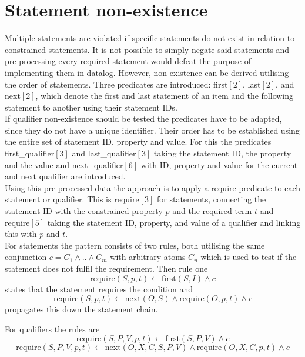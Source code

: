 \documentclass[hyperref,bachelorofscience,fleqn]{cgvpub}
\begin{document}
\section{Statement non-existence}\label{sec_statement_non-existence}
Multiple statements are violated if specific statements do not exist in relation to constrained statements. It is not possible to simply negate said statements and pre-processing every required statement would defeat the purpose of implementing them in datalog. However, non-existence can be derived utilising the order of statements. Three predicates are introduced: first\([2]\), last\([2]\), and next\([2]\), which denote the first and last statement of an item and the following statement to another using their statement IDs.\\

If qualifier non-existence should be tested the predicates have to be adapted, since they do not have a unique identifier. Their order has to be established using the entire set of statement ID, property and value. For this the predicates first\_qualifier\([3]\) and last\_qualifier\([3]\) taking the statement ID, the property and the value and next\_qualifier\([6]\) with ID, property and value for the current and next qualifier are introduced.\\

Using this pre-processed data the approach is to apply a require-predicate to each statement or qualifier. This is require\([3]\) for statements, connecting the statement ID with the constrained property \(p\) and the required term \(t\) and require\([5]\) taking the statement ID, property, and value of a qualifier and linking this with \(p\) and \(t\).\\

For statements the pattern consists of two rules, both utilising the same conjunction \(c = C_1 \wedge .. \wedge C_m\) with arbitrary atoms \(C_n\) which is used to test if the statement does not fulfil the requirement. Then rule one
\begin{equation*}
\text{require}(S, p, t) \leftarrow \text{first}(S, I) \wedge c
\end{equation*}
states that the statement requires the condition and
\begin{equation*}
\text{require}(S, p, t) \leftarrow \text{next}(O, S) \wedge \text{require}(O, p, t) \wedge c
\end{equation*}
propagates this down the statement chain.

For qualifiers the rules are
\begin{equation*}
\text{require}(S, P, V, p, t) \leftarrow \text{first}(S, P, V) \wedge c
\end{equation*}
\begin{equation*}
\text{require}(S, P, V, p, t) \leftarrow \text{next}(O, X, C, S, P, V) \wedge \text{require}(O, X, C, p, t) \wedge c
\end{equation*}
\end{document}
